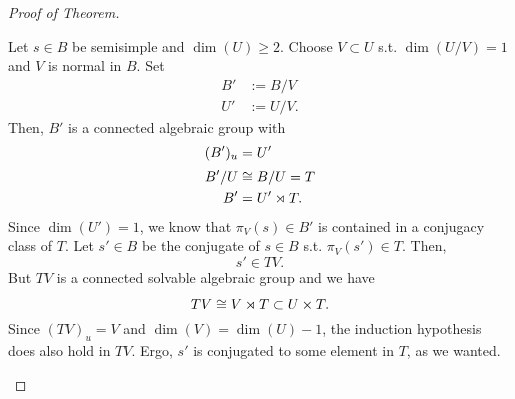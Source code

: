 \begin{proof}[Proof of Theorem]
\begin{itemize}
Let $s \in B$ be semisimple and $\dim(U) \geq 2$. Choose $V \subset U$ s.t. $\dim(U / V) = 1$ and $V$ is normal in $B$. Set
\begin{align*}
B' &:= B/V\\
U' &:= U/V.
\end{align*}
Then, $B'$ is a connected algebraic group with
\begin{align*}
(B')_u &= U'\\
B' / U& \overset{}{\cong} B/U = T\\
B' &= U' \rtimes T.
\end{align*}
Since $\dim(U') = 1$, we know that $\pi_V(s) \in B'$ is contained in a conjugacy class of $T$.
Let $s'\in B$ be the conjugate of $s \in B$ s.t. $\pi_V(s') \in T$. Then,
\[ s' \in TV. \]
But $TV$ is a connected solvable algebraic group and we have
\[ TV \overset{}{\cong} V \rtimes T \subset U \times T. \]
Since $(TV)_u = V$ and $\dim(V) = \dim(U) - 1$, the induction hypothesis does also hold in $TV$. Ergo, $s'$ is conjugated to some element in $T$, as we wanted.
	\end{itemize}
\end{proof}

